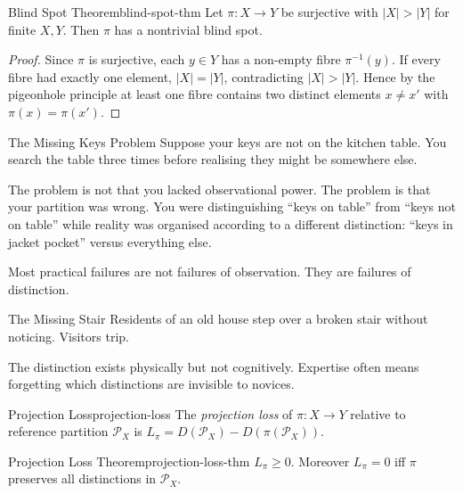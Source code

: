 \documentclass[12pt,twoside,openright]{book}
\newcommand{\partition}{\mathcal{P}}
\begin{document}
\begin{theorem}{Blind Spot Theorem}{blind-spot-thm}
  Let $\pi: X \to Y$ be surjective with $|X| > |Y|$
  for finite $X, Y$. Then $\pi$ has a nontrivial
  blind spot.
\end{theorem}

\begin{proof}
  Since $\pi$ is surjective, each $y \in Y$ has a
  non-empty fibre $\pi^{-1}(y)$. If every fibre had
  exactly one element, $|X| = |Y|$, contradicting
  $|X| > |Y|$. Hence by the pigeonhole principle at
  least one fibre contains two distinct elements
  $x \ne x'$ with $\pi(x) = \pi(x')$.
\end{proof}

\begin{distinctionaside}{The Missing Keys Problem}
Suppose your keys are not on the kitchen table. You search
the table three times before realising they might be
somewhere else.

The problem is not that you lacked observational power. The
problem is that your partition was wrong. You were
distinguishing ``keys on table'' from ``keys not on table''
while reality was organised according to a different
distinction: ``keys in jacket pocket'' versus everything
else.

Most practical failures are not failures of observation.
They are failures of distinction.
\end{distinctionaside}

\begin{distinctionaside}{The Missing Stair}
Residents of an old house step over a broken stair without
noticing. Visitors trip.

The distinction exists physically but not cognitively.
Expertise often means forgetting which distinctions are
invisible to novices.
\end{distinctionaside}

\begin{definition}{Projection Loss}{projection-loss}
  The \emph{projection loss} of $\pi: X \to Y$ relative
  to reference partition $\partition_X$ is
  $L_\pi = D(\partition_X) - D(\pi(\partition_X))$.
\end{definition}

\begin{theorem}{Projection Loss Theorem}{projection-loss-thm}
  $L_\pi \ge 0$. Moreover $L_\pi = 0$ iff $\pi$
  preserves all distinctions in $\partition_X$.
\end{theorem}
\end{document}
